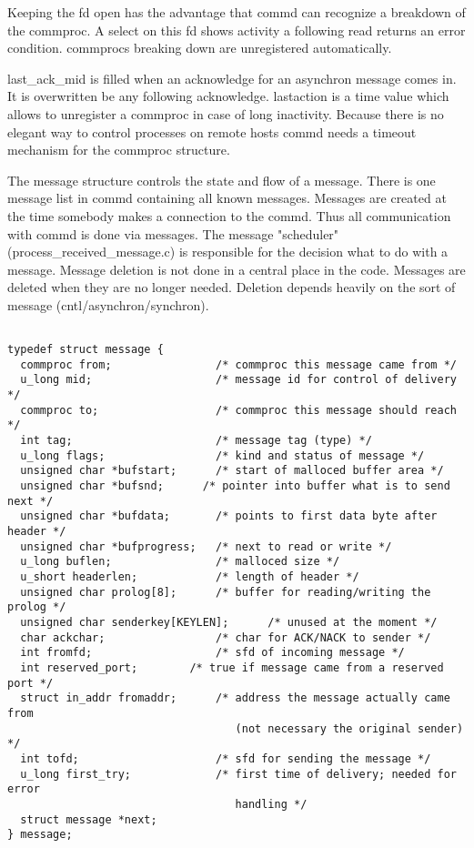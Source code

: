 Keeping the fd open has the advantage that commd can recognize a breakdown
of the commproc. A select on this fd shows activity a following read returns
an error condition. commprocs breaking down are unregistered automatically.

last\_ack\_mid is filled when an acknowledge for an asynchron message comes in.
It is overwritten be any following acknowledge. lastaction is a time value
which allows to unregister a commproc in case of long inactivity.
Because there is no elegant way to control processes on remote hosts
commd needs a timeout mechanism for the commproc structure.
\bigskip

The message structure controls the state and flow of a message. There
is one message list in commd containing all known messages. Messages
are created at the time somebody makes a connection to the commd. Thus
all communication with commd is done via messages. The
message "scheduler" (process\_received\_message.c) is responsible for
the decision what to do with a message. Message deletion is not done
in a central place in the code. Messages are deleted when they are no
longer needed. Deletion depends heavily on the sort of message
(cntl/asynchron/synchron).

\begin{verbatim}

typedef struct message {
  commproc from;                /* commproc this message came from */
  u_long mid;                   /* message id for control of delivery */
  commproc to;                  /* commproc this message should reach */
  int tag;                      /* message tag (type) */
  u_long flags;                 /* kind and status of message */
  unsigned char *bufstart;      /* start of malloced buffer area */
  unsigned char *bufsnd;      /* pointer into buffer what is to send next */
  unsigned char *bufdata;       /* points to first data byte after header */
  unsigned char *bufprogress;   /* next to read or write */ 
  u_long buflen;                /* malloced size */
  u_short headerlen;            /* length of header */
  unsigned char prolog[8];      /* buffer for reading/writing the prolog */
  unsigned char senderkey[KEYLEN];      /* unused at the moment */
  char ackchar;                 /* char for ACK/NACK to sender */
  int fromfd;                   /* sfd of incoming message */
  int reserved_port;        /* true if message came from a reserved port */
  struct in_addr fromaddr;      /* address the message actually came from
                                   (not necessary the original sender) */
  int tofd;                     /* sfd for sending the message */
  u_long first_try;             /* first time of delivery; needed for error
                                   handling */
  struct message *next;
} message;

\end{verbatim}

